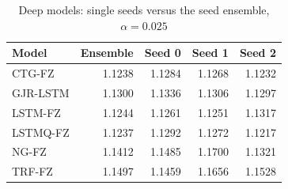 \begin{table}[htbp]
\centering
\footnotesize
\caption{Deep models: single seeds versus the seed ensemble, $\alpha=0.025$}
\label{tab:seeds}
\begin{tabular}{lrrrr}
\toprule
Model & Ensemble & Seed 0 & Seed 1 & Seed 2 \\
\midrule
CTG-FZ & 1.1238 & 1.1284 & 1.1268 & 1.1232 \\
GJR-LSTM & 1.1300 & 1.1336 & 1.1306 & 1.1297 \\
LSTM-FZ & 1.1244 & 1.1261 & 1.1251 & 1.1317 \\
LSTMQ-FZ & 1.1237 & 1.1292 & 1.1272 & 1.1217 \\
NG-FZ & 1.1412 & 1.1485 & 1.1700 & 1.1321 \\
TRF-FZ & 1.1497 & 1.1459 & 1.1656 & 1.1528 \\
\bottomrule
\end{tabular}
\end{table}